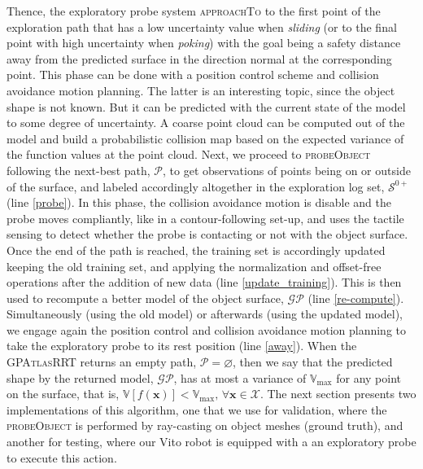 Thence, the exploratory probe system \textsc{approachTo} to the first point of the exploration path that has a low uncertainty value when \emph{sliding} (or to the final point with high uncertainty when \emph{poking}) with the goal being a safety distance away from the predicted surface in the direction normal at the corresponding point. This phase can be done with a position control scheme and collision avoidance motion planning. The latter is an interesting topic, since the object shape is not known. But it can be predicted with the current state of the model to some degree of uncertainty. A coarse point cloud can be computed out of the model and build a probabilistic collision map based on the expected variance of the function values at the point cloud. Next, we proceed to \textsc{probeObject} following the next-best path, $\mathcal{P}$, to get observations of points being on or outside of the surface, and labeled accordingly altogether in the exploration log set, $\mathcal{S}^{0+}$ (line \ref{probe}). In this phase, the collision avoidance motion is disable and the probe moves compliantly, like in a contour-following set-up, and uses the tactile sensing to detect whether the probe is contacting or not with the object surface. Once the end of the path is reached, the training set is accordingly updated keeping the old training set, and applying the normalization and offset-free operations after the addition of new data (line \ref{update_training}). This is then used to recompute a better model of the object surface, $\mathcal{GP}$ (line \ref{re-compute}). Simultaneously (using the old model) or afterwards (using the updated model), we engage again the position control and collision avoidance motion planning to take the exploratory probe to its rest position (line \ref{away}). When the \textsc{GPAtlasRRT} returns an empty path, $\mathcal{P} = \varnothing$, then we say that the predicted shape by the returned model, $\mathcal{GP}$, has at most a variance of $\mathbb{V}_{\max}$ for any point on the surface, that is, $\mathbb{V}[f(\mathbf{x})] < \mathbb{V}_{\max}, \, \forall \mathbf{x} \in \mathcal{X}$. The next section presents two implementations of this algorithm, one that we use for validation, where the \textsc{probeObject} is performed by ray-casting on object meshes (ground truth), and another for testing, where our Vito robot is equipped with a an exploratory probe to execute this action.

